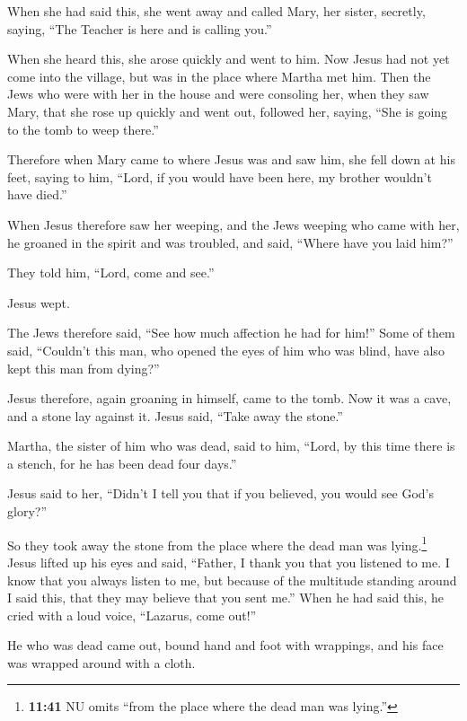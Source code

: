  When she had said this, she went away and called Mary,
her sister, secretly, saying, ``The Teacher is here and is calling
you.''

 When she heard this, she arose quickly and went to him.
 Now Jesus had not yet come into the village, but was in
the place where Martha met him.  Then the Jews who were
with her in the house and were consoling her, when they saw Mary, that
she rose up quickly and went out, followed her, saying, ``She is going
to the tomb to weep there.''

 Therefore when Mary came to where Jesus was and saw him,
she fell down at his feet, saying to him, ``Lord, if you would have been
here, my brother wouldn't have died.''

 When Jesus therefore saw her weeping, and the Jews
weeping who came with her, he groaned in the spirit and was troubled,
 and said, ``Where have you laid him?''

They told him, ``Lord, come and see.''

 Jesus wept.

 The Jews therefore said, ``See how much affection he had
for him!''  Some of them said, ``Couldn't this man, who
opened the eyes of him who was blind, have also kept this man from
dying?''

 Jesus therefore, again groaning in himself, came to the
tomb. Now it was a cave, and a stone lay against it. 
Jesus said, ``Take away the stone.''

Martha, the sister of him who was dead, said to him, ``Lord, by this
time there is a stench, for he has been dead four days.''

 Jesus said to her, ``Didn't I tell you that if you
believed, you would see God's glory?''

 So they took away the stone from the place where the
dead man was lying.\footnote{\textbf{11:41} NU omits ``from the place
  where the dead man was lying.''} Jesus lifted up his eyes and said,
``Father, I thank you that you listened to me.  I know
that you always listen to me, but because of the multitude standing
around I said this, that they may believe that you sent me.''
 When he had said this, he cried with a loud voice,
``Lazarus, come out!''

 He who was dead came out, bound hand and foot with
wrappings, and his face was wrapped around with a cloth.

